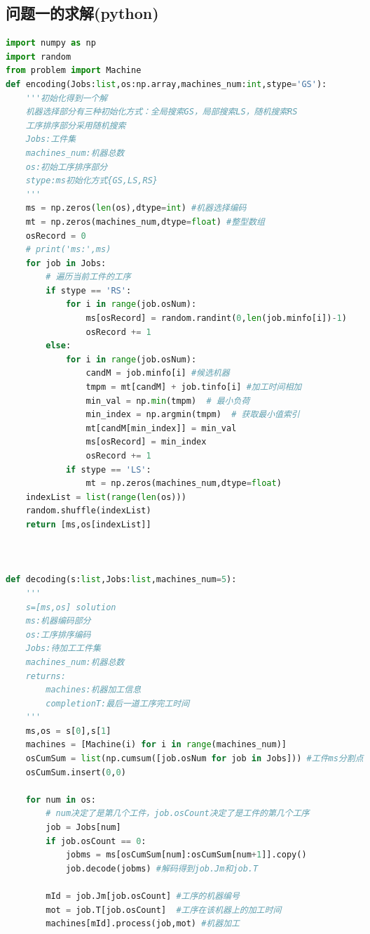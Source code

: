 \documentclass{whutmod}
\begin{document}
\begin{spacing}{1.2}
\subsection{问题一的求解(python)}
\begin{lstlisting}[language=python]
import numpy as np
import random
from problem import Machine
def encoding(Jobs:list,os:np.array,machines_num:int,stype='GS'):
    '''初始化得到一个解
    机器选择部分有三种初始化方式：全局搜索GS，局部搜索LS，随机搜索RS
    工序排序部分采用随机搜索
    Jobs:工件集
    machines_num:机器总数
    os:初始工序排序部分
    stype:ms初始化方式{GS,LS,RS}
    '''
    ms = np.zeros(len(os),dtype=int) #机器选择编码
    mt = np.zeros(machines_num,dtype=float) #整型数组
    osRecord = 0
    # print('ms:',ms)
    for job in Jobs:
        # 遍历当前工件的工序
        if stype == 'RS':
            for i in range(job.osNum):
                ms[osRecord] = random.randint(0,len(job.minfo[i])-1)
                osRecord += 1
        else:
            for i in range(job.osNum):
                candM = job.minfo[i] #候选机器
                tmpm = mt[candM] + job.tinfo[i] #加工时间相加
                min_val = np.min(tmpm)  # 最小负荷
                min_index = np.argmin(tmpm)  # 获取最小值索引
                mt[candM[min_index]] = min_val
                ms[osRecord] = min_index
                osRecord += 1
            if stype == 'LS':
                mt = np.zeros(machines_num,dtype=float) 
    indexList = list(range(len(os)))
    random.shuffle(indexList)
    return [ms,os[indexList]]



def decoding(s:list,Jobs:list,machines_num=5):
    '''
    s=[ms,os] solution
    ms:机器编码部分
    os:工序排序编码
    Jobs:待加工工件集
    machines_num:机器总数
    returns:
        machines:机器加工信息
        completionT:最后一道工序完工时间
    '''
    ms,os = s[0],s[1]
    machines = [Machine(i) for i in range(machines_num)]
    osCumSum = list(np.cumsum([job.osNum for job in Jobs])) #工件ms分割点
    osCumSum.insert(0,0)

    for num in os:
        # num决定了是第几个工件，job.osCount决定了是工件的第几个工序
        job = Jobs[num]
        if job.osCount == 0:
            jobms = ms[osCumSum[num]:osCumSum[num+1]].copy()
            job.decode(jobms) #解码得到job.Jm和job.T
        
        mId = job.Jm[job.osCount] #工序的机器编号
        mot = job.T[job.osCount]  #工序在该机器上的加工时间
        machines[mId].process(job,mot) #机器加工


\end{lstlisting}
\end{spacing}
\end{document}
